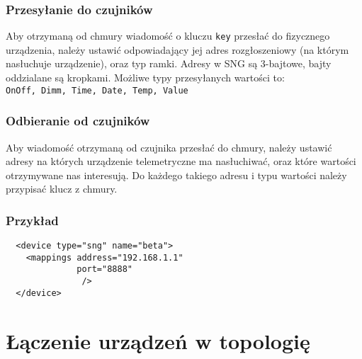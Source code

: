 \documentclass[11pt]{article}
\begin{document}
\subsubsection{Przesyłanie do czujników}
Aby otrzymaną od chmury wiadomość o kluczu \verb|key| przesłać do fizycznego urządzenia,
należy ustawić odpowiadający jej adres rozgłoszeniowy (na którym nasłuchuje urządzenie), 
oraz typ ramki. Adresy w SNG są 3-bajtowe, bajty oddzialane są kropkami. 
Możliwe typy przesyłanych wartości to:\\
\verb|OnOff, Dimm, Time, Date, Temp, Value|

\subsubsection{Odbieranie od czujników}
Aby wiadomość otrzymaną od czujnika przesłać do chmury, należy ustawić adresy na których urządzenie telemetryczne
ma nasłuchiwać, oraz które wartości otrzymywane nas interesują. Do każdego takiego adresu i typu wartości
należy przypisać klucz z chmury.

\subsubsection{Przykład}
\begin{verbatim}
  <device type="sng" name="beta">
    <mappings address="192.168.1.1"
              port="8888"
               />
  </device>
\end{verbatim}


\section{Łączenie urządzeń w topologię}
\end{document}
